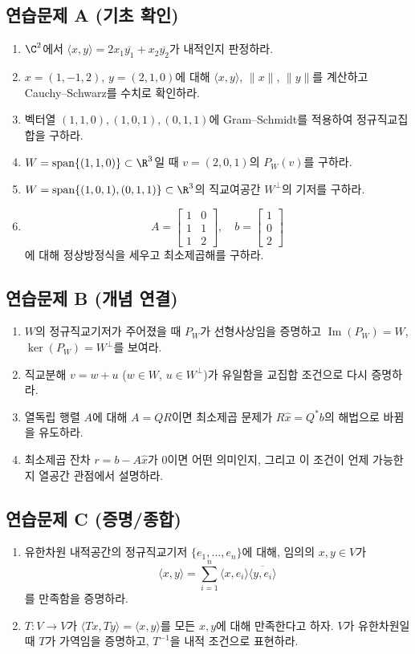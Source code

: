 \subsection*{연습문제 A (기초 확인)}
\begin{enumerate}[label=\textbf{A\arabic*.}]
\item $\C^2$에서 $\langle x,y\rangle=2x_1\overline{y_1}+x_2\overline{y_2}$가 내적인지 판정하라.
\item $x=(1,-1,2)$, $y=(2,1,0)$에 대해 $\langle x,y\rangle$, $\|x\|$, $\|y\|$를 계산하고 Cauchy--Schwarz를 수치로 확인하라.
\item 벡터열 $(1,1,0),(1,0,1),(0,1,1)$에 Gram--Schmidt를 적용하여 정규직교집합을 구하라.
\item $W=\operatorname{span}\{(1,1,0)\}\subset\R^3$일 때 $v=(2,0,1)$의 $P_W(v)$를 구하라.
\item $W=\operatorname{span}\{(1,0,1),(0,1,1)\}\subset\R^3$의 직교여공간 $W^\perp$의 기저를 구하라.
\item 
$$
A=
\begin{bmatrix}
1&0\\
1&1\\
1&2
\end{bmatrix},\quad
b=
\begin{bmatrix}
1\\0\\2
\end{bmatrix}
$$
에 대해 정상방정식을 세우고 최소제곱해를 구하라.
\end{enumerate}

\subsection*{연습문제 B (개념 연결)}
\begin{enumerate}[label=\textbf{B\arabic*.}]
\item $W$의 정규직교기저가 주어졌을 때 $P_W$가 선형사상임을 증명하고 $\operatorname{Im}(P_W)=W$, $\ker(P_W)=W^\perp$를 보여라.
\item 직교분해 $v=w+u$ ($w\in W$, $u\in W^\perp$)가 유일함을 교집합 조건으로 다시 증명하라.
\item 열독립 행렬 $A$에 대해 $A=QR$이면 최소제곱 문제가 $R\hat x=Q^*b$의 해법으로 바뀜을 유도하라.
\item 최소제곱 잔차 $r=b-A\hat x$가 0이면 어떤 의미인지, 그리고 이 조건이 언제 가능한지 열공간 관점에서 설명하라.
\end{enumerate}

\subsection*{연습문제 C (증명/종합)}
\begin{enumerate}[label=\textbf{C\arabic*.}]
\item 유한차원 내적공간의 정규직교기저 $\{e_1,\dots,e_n\}$에 대해, 임의의 $x,y\in V$가
$$
\langle x,y\rangle=\sum_{i=1}^n \langle x,e_i\rangle\overline{\langle y,e_i\rangle}
$$
를 만족함을 증명하라.
\item $T:V\to V$가 $\langle Tx,Ty\rangle=\langle x,y\rangle$를 모든 $x,y$에 대해 만족한다고 하자. $V$가 유한차원일 때 $T$가 가역임을 증명하고, $T^{-1}$을 내적 조건으로 표현하라.
\end{enumerate}